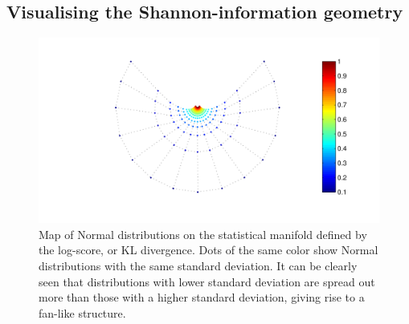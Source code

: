 \subsection{Visualising the Shannon-information geometry}

\begin{figure}
	\includegraphics[width=\columnwidth]{figs/embeddings/Normal_KL}
	\caption{Map of Normal distributions on the statistical manifold defined by the log-score, or KL divergence. Dots of the same color show Normal distributions with the same standard deviation. It can be clearly seen that distributions with lower standard deviation are spread out more than those with a higher standard deviation, giving rise to a fan-like structure.}
\end{figure}


